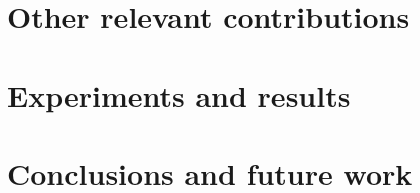 \section{Other relevant contributions}



\section{Experiments and results}



\section{Conclusions and future work}



\newpage



\newpage
\robospecs

\nocite{*}


